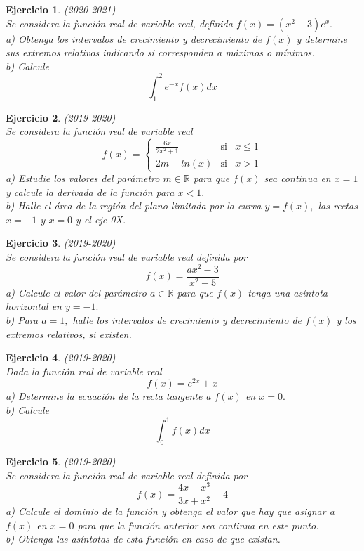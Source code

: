 \documentclass[12pt, a4paper]{amsart}
\newtheorem{ejer}{Ejercicio}
\begin{document}
\begin{ejer}\em (2020-2021)\\
Se considera la función real de variable real, definida $f(x) = (x^2 - 3)e^x.$\\
a) Obtenga los intervalos de crecimiento y decrecimiento de $f(x)$ y determine sus extremos relativos indicando si corresponden a máximos o mínimos.\\
b) Calcule 
\[\int_1^2e^{-x}f(x)dx\]
\end{ejer}

\newpage

\begin{ejer}\em (2019-2020)\\
Se considera la función real de variable real
\[
f(x)=\left \{ \begin{matrix}
\frac{6x}{2x^2+1} & \text{si} & x \leqslant 1\\
2m+ln(x) & \text{si} & x> 1
\end{matrix}\right.
\]
a) Estudie los valores del parámetro $m\in\mathbb{R}$ para que $f (x)$ sea continua en $x = 1$ y calcule la derivada de la función para $x < 1 .$\\
b) Halle el área de la región del plano limitada por la curva $y = f (x) ,$ las rectas $x= -1$ y $x = 0$ y el eje 0X.
\end{ejer}

\begin{ejer}\em (2019-2020)\\
Se considera la función real de variable real definida por
\[f(x) =\frac{ax^2-3}{x^2-5}\]
a) Calcule el valor del parámetro $a\in \mathbb{R}$ para que $f (x)$ tenga una asíntota horizontal en $y = -1 .$\\
b) Para $a = 1,$ halle los intervalos de crecimiento y decrecimiento de $f (x)$ y los extremos relativos, si existen.
\end{ejer}

\begin{ejer}\em (2019-2020)\\
Dada la función real de variable real
\[f (x) = e^{2x} + x\]
a) Determine la ecuación de la recta tangente a $f (x)$ en $x = 0.$\\
b) Calcule
\[\int_0^1 f(x)dx\]
\end{ejer}

\begin{ejer}\em (2019-2020)\\
Se considera la función real de variable real definida por
\[f(x)=\frac{4x-x^3}{3x+x^2}+4\]
a) Calcule el dominio de la función y obtenga el valor que hay que asignar a $f (x)$ en $x = 0$ para que la función anterior sea continua en este punto.\\
b) Obtenga las asíntotas de esta función en caso de que existan.
\end{ejer}
\end{document}
